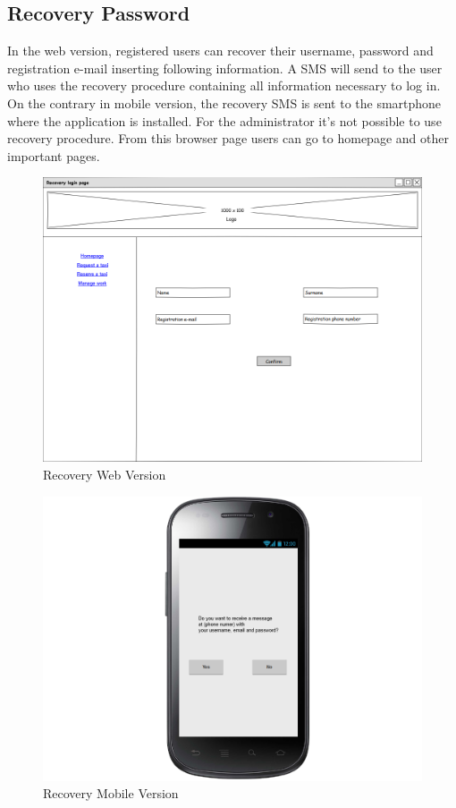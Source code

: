 \subsection{Recovery Password}
In the web version, registered users can recover their username, password and registration e-mail inserting following information. A SMS will send to the user who uses the recovery procedure containing all information necessary to log in. \newline On the contrary in mobile version, the recovery SMS is sent to the smartphone where the application is installed. \newline For the administrator it's not possible to use recovery procedure. \newline From this browser page users can go to homepage and other important pages.  
\begin{figure}[H]
\centering
\includegraphics[scale=0.35]{mockups/recovery_login_page_web.png}
\caption{Recovery Web Version}
\end{figure}
\begin{figure}[H]
\centering
\includegraphics[scale=0.35]{mockups/recovery_login_mobile.png}
\caption{Recovery Mobile Version}
\end{figure}
\break
